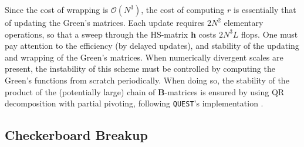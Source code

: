 Since the cost of wrapping is $\mathcal{O}(N^3)$, the cost of computing $r$ is essentially that of updating the Green's matrices.
Each update requires $2N^2$ elementary operations, so that a sweep through the HS-matrix $\bm h$ costs $2 N^3 L$ flops.
One must pay attention to the efficiency (by delayed updates), and stability of the updating and wrapping of the Green's matrices.
When numerically divergent scales are present, the instability of this scheme must be controlled by computing the Green's functions from scratch periodically.
When doing so, the stability of the product of the (potentially large) chain of $\bm B$-matrices is ensured by using QR decomposition with partial pivoting, following \texttt{QUEST}'s implementation \cite{hou_numerical_2009}.

\subsection{Checkerboard Breakup}
\label{subsec:checkerboard}

